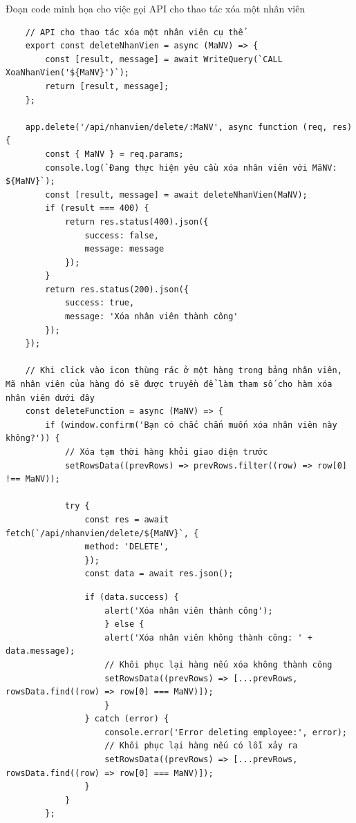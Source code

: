 \newpage
Đoạn code minh họa cho việc gọi API cho thao tác xóa một nhân viên
\begin{verbatim}
    // API cho thao tác xóa một nhân viên cụ thể
    export const deleteNhanVien = async (MaNV) => {
        const [result, message] = await WriteQuery(`CALL XoaNhanVien('${MaNV}')`);
        return [result, message];
    };

    app.delete('/api/nhanvien/delete/:MaNV', async function (req, res) {
        const { MaNV } = req.params;
        console.log(`Đang thực hiện yêu cầu xóa nhân viên với MãNV: ${MaNV}`);
        const [result, message] = await deleteNhanVien(MaNV);
        if (result === 400) {
            return res.status(400).json({
                success: false,
                message: message
            });
        }
        return res.status(200).json({
            success: true,
            message: 'Xóa nhân viên thành công'
        });
    });

    // Khi click vào icon thùng rác ở một hàng trong bảng nhân viên, Mã nhân viên của hàng đó sẽ được truyền để làm tham số cho hàm xóa nhân viên dưới đây
    const deleteFunction = async (MaNV) => {
        if (window.confirm('Bạn có chắc chắn muốn xóa nhân viên này không?')) {
            // Xóa tạm thời hàng khỏi giao diện trước
            setRowsData((prevRows) => prevRows.filter((row) => row[0] !== MaNV));
        
            try {
                const res = await fetch(`/api/nhanvien/delete/${MaNV}`, {
                method: 'DELETE',
                });
                const data = await res.json();
\end{verbatim}
\begin{verbatim}
                if (data.success) {
                    alert('Xóa nhân viên thành công');
                    } else {
                    alert('Xóa nhân viên không thành công: ' + data.message);
                    // Khôi phục lại hàng nếu xóa không thành công
                    setRowsData((prevRows) => [...prevRows, rowsData.find((row) => row[0] === MaNV)]);
                    }
                } catch (error) {
                    console.error('Error deleting employee:', error);
                    // Khôi phục lại hàng nếu có lỗi xảy ra
                    setRowsData((prevRows) => [...prevRows, rowsData.find((row) => row[0] === MaNV)]);
                }
            }
        };
\end{verbatim}

\newpage
